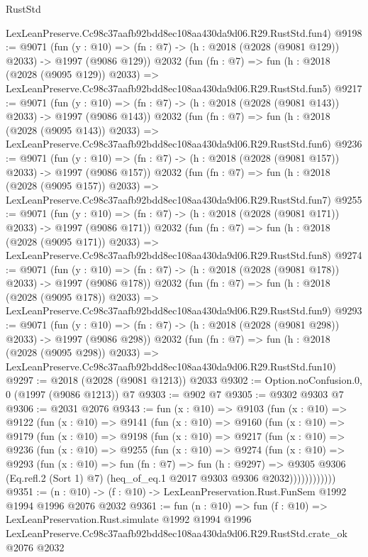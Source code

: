 \begin{lexlean}{RustStd}
\begin{coremodule}
    LexLeanPreserve.Cc98c37aafb92bdd8ec108aa430da9d06.R29.RustStd.fun4)
@9198 := @9071
    (fun (y : @10) => (fn : @7) -> (h : @2018 (@2028 (@9081 @129)) @2033) -> @1997 (@9086 @129))
    @2032
    (fun (fn : @7) =>
    fun (h : @2018 (@2028 (@9095 @129)) @2033) =>
    LexLeanPreserve.Cc98c37aafb92bdd8ec108aa430da9d06.R29.RustStd.fun5)
@9217 := @9071
    (fun (y : @10) => (fn : @7) -> (h : @2018 (@2028 (@9081 @143)) @2033) -> @1997 (@9086 @143))
    @2032
    (fun (fn : @7) =>
    fun (h : @2018 (@2028 (@9095 @143)) @2033) =>
    LexLeanPreserve.Cc98c37aafb92bdd8ec108aa430da9d06.R29.RustStd.fun6)
@9236 := @9071
    (fun (y : @10) => (fn : @7) -> (h : @2018 (@2028 (@9081 @157)) @2033) -> @1997 (@9086 @157))
    @2032
    (fun (fn : @7) =>
    fun (h : @2018 (@2028 (@9095 @157)) @2033) =>
    LexLeanPreserve.Cc98c37aafb92bdd8ec108aa430da9d06.R29.RustStd.fun7)
@9255 := @9071
    (fun (y : @10) => (fn : @7) -> (h : @2018 (@2028 (@9081 @171)) @2033) -> @1997 (@9086 @171))
    @2032
    (fun (fn : @7) =>
    fun (h : @2018 (@2028 (@9095 @171)) @2033) =>
    LexLeanPreserve.Cc98c37aafb92bdd8ec108aa430da9d06.R29.RustStd.fun8)
@9274 := @9071
    (fun (y : @10) => (fn : @7) -> (h : @2018 (@2028 (@9081 @178)) @2033) -> @1997 (@9086 @178))
    @2032
    (fun (fn : @7) =>
    fun (h : @2018 (@2028 (@9095 @178)) @2033) =>
    LexLeanPreserve.Cc98c37aafb92bdd8ec108aa430da9d06.R29.RustStd.fun9)
@9293 := @9071
    (fun (y : @10) => (fn : @7) -> (h : @2018 (@2028 (@9081 @298)) @2033) -> @1997 (@9086 @298))
    @2032
    (fun (fn : @7) =>
    fun (h : @2018 (@2028 (@9095 @298)) @2033) =>
    LexLeanPreserve.Cc98c37aafb92bdd8ec108aa430da9d06.R29.RustStd.fun10)
@9297 := @2018 (@2028 (@9081 @1213)) @2033
@9302 := Option.noConfusion.{0, 0} (@1997 (@9086 @1213)) @7
@9303 := @902 @7
@9305 := @9302 @9303 @7
@9306 := @2031 @2076
@9343 := fun (x : @10) =>
  @9103
    (fun (x : @10) =>
    @9122
      (fun (x : @10) =>
      @9141
        (fun (x : @10) =>
        @9160
          (fun (x : @10) =>
          @9179
            (fun (x : @10) =>
            @9198
              (fun (x : @10) =>
              @9217
                (fun (x : @10) =>
                @9236
                  (fun (x : @10) =>
                  @9255
                    (fun (x : @10) =>
                    @9274
                      (fun (x : @10) =>
                      @9293
                        (fun (x : @10) =>
                        fun (fn : @7) =>
                        fun (h : @9297) =>
                        @9305
                          @9306
                          (Eq.refl.{2} (Sort 1) @7)
                          (heq_of_eq.{1} @2017 @9303 @9306 @2032))))))))))))
@9351 := (n : @10) -> (f : @10) -> LexLeanPreservation.Rust.FunSem @1992 @1994 @1996 @2076 @2032
@9361 := fun (n : @10) =>
  fun (f : @10) =>
  LexLeanPreservation.Rust.simulate
    @1992
    @1994
    @1996
    LexLeanPreserve.Cc98c37aafb92bdd8ec108aa430da9d06.R29.RustStd.crate_ok
    @2076
    @2032
\end{coremodule}
\end{lexlean}

